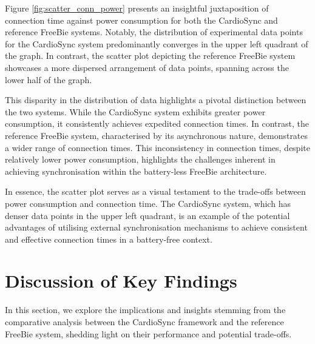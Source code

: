 \noindent Figure \ref{fig:scatter_conn_power} presents an insightful juxtaposition of connection time against power consumption for both the CardioSync and reference FreeBie systems. Notably, the distribution of experimental data points for the CardioSync system predominantly converges in the upper left quadrant of the graph. In contrast, the scatter plot depicting the reference FreeBie system showcases a more dispersed arrangement of data points, spanning across the lower half of the graph.
\vspace{1\baselineskip}

\noindent This disparity in the distribution of data highlights a pivotal distinction between the two systems. While the CardioSync system exhibits greater power consumption, it consistently achieves expedited connection times. In contrast, the reference FreeBie system, characterised by its asynchronous nature, demonstrates a wider range of connection times. This inconsistency in connection times, despite relatively lower power consumption, highlights the challenges inherent in achieving synchronisation within the battery-less FreeBie architecture.
\vspace{1\baselineskip}

\noindent In essence, the scatter plot serves as a visual testament to the trade-offs between power consumption and connection time. The CardioSync system, which has denser data points in the upper left quadrant, is an example of the potential advantages of utilising external synchronisation mechanisms to achieve consistent and effective connection times in a battery-free context.


\section{Discussion of Key Findings}
In this section, we explore the implications and insights stemming from the comparative analysis between the CardioSync framework and the reference FreeBie system, shedding light on their performance and potential trade-offs.


